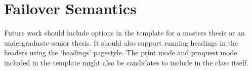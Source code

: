 \section{Failover Semantics}

Future work should include options in the template for a masters thesis or an undergraduate senior thesis. It should also support running headings in the headers using the `headings' pagestyle.  The print mode and proquest mode included in the template might also be candidates to include in the class itself. 

 